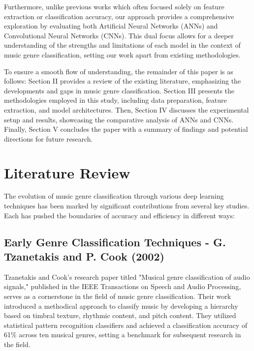 \documentclass[lettersize,journal]{IEEEtran}
\begin{document}
Furthermore, unlike previous works which often focused solely on feature extraction or classification accuracy, our approach provides a comprehensive exploration by evaluating both Artificial Neural Networks (ANNs) and Convolutional Neural Networks (CNNs). This dual focus allows for a deeper understanding of the strengths and limitations of each model in the context of music genre classification, setting our work apart from existing methodologies.
\vspace{\baselineskip}

To ensure a smooth flow of understanding, the remainder of this paper is as follows: Section II provides a review of the existing literature, emphasizing the developments and gaps in music genre classification. Section III presents the methodologies employed in this study, including data preparation, feature extraction, and model architectures. Then, Section IV discusses the experimental setup and results, showcasing the comparative analysis of ANNs and CNNs. Finally, Section V concludes the paper with a summary of findings and potential directions for future research.


\section{Literature Review}
The evolution of music genre classification through various deep learning techniques has been marked by significant contributions from several key studies. Each has pushed the boundaries of accuracy and efficiency in different ways:

\subsection{\textbf{Early Genre Classification Techniques - G. Tzanetakis and P. Cook (2002)}}
    Tzanetakis and Cook’s research paper titled "Musical genre classification of audio signals," published in the IEEE Transactions on Speech and Audio Processing, serves as a cornerstone in the field of music genre classification. Their work introduced a methodical approach to classify music by developing a hierarchy based on timbral texture, rhythmic content, and pitch content. They utilized statistical pattern recognition classifiers and achieved a classification accuracy of 61\% across ten musical genres, setting a benchmark for subsequent research in the field.
\end{document}
